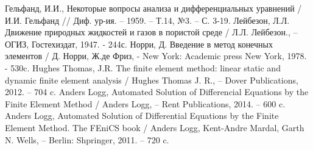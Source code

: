 \begin{center}
\end{center}

\renewcommand\refname{}
\begin{thebibliography}{9}
        Гельфанд, И.И.,
        {Некоторые вопросы анализа и дифференциальных уравнений} /
        И.И. Гельфанд  // Диф. ур-ия. -- 1959. -- Т.14, №3. -- С. 3-19.
        Лейбезон, Л.Л.
        {Движение природных жидкостей и газов в пористой среде} /
        Л.Л. Лейбезон., -- ОГИЗ, Гостехиздат, 1947. - 244с.
        Норри, Д.
        {Введение в метод конечных элементов} /
        Д. Норри, Ж.де Фриз, - New York: Academic press New York, 1978. - 530c.
        Hughes Thomas, J.R.
        {The finite element method: linear static and dynamic finite element analysis} /
        Hughes Thomas J. R., -- Dover Publications, 2012. -- 704 c.
        Anders Logg,
        {Automated Solution of Differencial Equations by the Finite Element Method} /
        Anders Logg, -- Rent Publications, 2014. -- 600 c.
        Anders Logg,
        {Automated Solution of Differential Equations by the Finite Element Method. The FEniCS book} /
        Anders Logg, Kent-Andre Mardal, Garth N. Wells, -- Berlin: Shpringer, 2011. -- 720 c.
\end{thebibliography}
